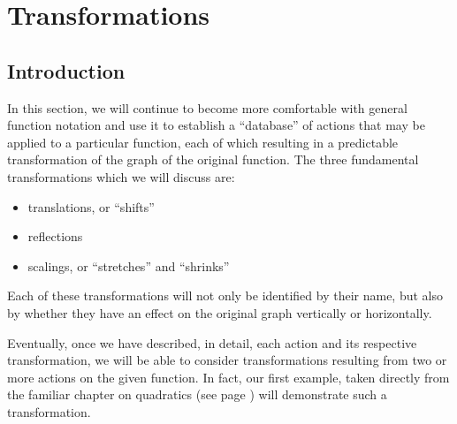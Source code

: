 \documentclass[12pt]{book}
\theoremstyle{definition}
\begin{document}
\section{Transformations}
\subsection{Introduction}
In this section, we will continue to become more comfortable with general function notation and use it to establish a ``database'' of actions that may be applied to a particular function, each of which resulting in a predictable transformation of the graph of the original function.  The three fundamental transformations which we will discuss are:
\newpage
\begin{itemize}
	\item translations, or ``shifts''
	\item reflections
	\item scalings, or ``stretches'' and ``shrinks''
\end{itemize}
Each of these transformations will not only be identified by their name, but also by whether they have an effect on the original graph vertically or horizontally.\par
Eventually, once we have described, in detail, each action and its respective transformation, we will be able to consider transformations resulting from two or more actions on the given function.  In fact, our first example, taken directly from the familiar chapter on quadratics (see page \pageref{trans1})
will demonstrate such a transformation.
\end{document}
